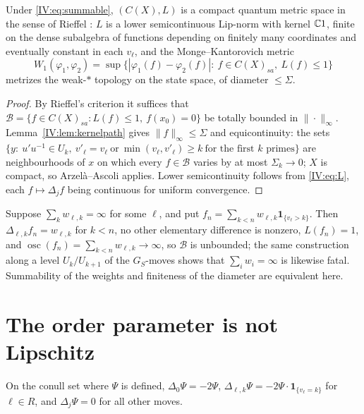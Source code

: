 \begin{theorem}\label{IV:thm:cqms}
Under \eqref{IV:eq:summable}, $(C(X),L)$ is a compact quantum metric space in the sense of
Rieffel \cite{Rieffel98,Rieffel}: $L$ is a lower semicontinuous Lip-norm with kernel
$\mathbb{C}1$, finite on the dense subalgebra of functions depending on finitely many coordinates
and eventually constant in each $v_\ell$, and the Monge--Kantorovich metric
\[
W_1(\varphi_1,\varphi_2)=\sup\bigl\{|\varphi_1(f)-\varphi_2(f)|:\ f\in C(X)_{sa},\ L(f)\le1\bigr\}
\]
metrizes the weak-$*$ topology on the state space, of diameter $\le\Sigma$.
\end{theorem}

\begin{proof}
By Rieffel's criterion \cite[Thm.~1.8]{Rieffel98} it suffices that
$\mathcal B=\{f\in C(X)_{sa}:L(f)\le1,\ f(x_0)=0\}$ be totally bounded in $\|\cdot\|_\infty$.
Lemma~\ref{IV:lem:kernelpath} gives $\|f\|_\infty\le\Sigma$ and equicontinuity: the sets
$\{y:\ u'u^{-1}\in U_k,\ v'_\ell=v_\ell\ \text{or}\ \min(v_\ell,v'_\ell)\ge k\ \text{for the first }k\text{ primes}\}$
are neighbourhoods of $x$ on which every $f\in\mathcal B$ varies by at most $\Sigma_k\to0$;
$X$ is compact, so Arzel\`a--Ascoli applies. Lower semicontinuity follows from \eqref{IV:eq:L}, each
$f\mapsto\Delta_jf$ being continuous for uniform convergence.
\end{proof}

\begin{remark}\label{IV:rem:necessary}
Suppose $\sum_kw_{\ell,k}=\infty$ for some $\ell$, and put
$f_n=\sum_{k<n}w_{\ell,k}\mathbf 1_{\{v_\ell>k\}}$. Then $\Delta_{\ell,k}f_n=w_{\ell,k}$ for
$k<n$, no other elementary difference is nonzero, $L(f_n)=1$, and
$\operatorname{osc}(f_n)=\sum_{k<n}w_{\ell,k}\to\infty$, so $\mathcal B$ is unbounded; the
same construction along a level $U_k/U_{k+1}$ of the $G_S$-moves shows that
$\sum_iw_i=\infty$ is likewise fatal. Summability of the weights and finiteness of the
diameter are equivalent here.
\end{remark}

\section{The order parameter is not Lipschitz}

\begin{lemma}\label{IV:lem:diffPsi}
On the conull set where $\Psi$ is defined,
$\Delta_0\Psi=-2\Psi$, $\Delta_{\ell,k}\Psi=-2\Psi\cdot\mathbf 1_{\{v_\ell=k\}}$ for
$\ell\in R$, and $\Delta_j\Psi=0$ for all other moves.
\end{lemma}

